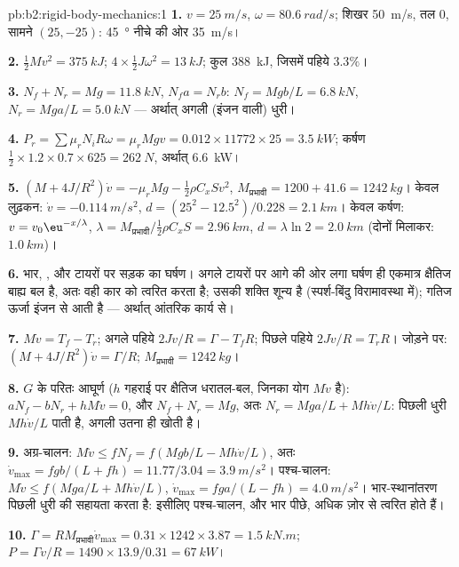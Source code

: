 \begin{solution}{pb:b2:rigid-body-mechanics:1}
\textbf{1.} $v = \qty{25}{m/s}$, $\omega = \qty{80.6}{rad/s}$; शिखर \qty{50}{m/s},
तल $0$, सामने $(25, -25)$: \qty{45}{\degree} नीचे की ओर \qty{35}{m/s}।

\textbf{2.} $\tfrac12Mv^2 = \qty{375}{kJ}$;
$4 \times \tfrac12J\omega^2 = \qty{13}{kJ}$;
कुल \qty{388}{kJ}, जिसमें पहिये $3.3\%$।

\textbf{3.} $N_f + N_r = Mg = \qty{11.8}{kN}$, $N_fa = N_rb$:
$N_f = Mgb/L =
\qty{6.8}{kN}$, $N_r = Mga/L = \qty{5.0}{kN}$ --- अर्थात्
अगली (इंजन वाली) धुरी।

\textbf{4.}
$P_r = \sum\mu_rN_iR\omega = \mu_rMgv = 0.012 \times 11772 \times 25 =
\qty{3.5}{kW}$;
कर्षण $\tfrac12 \times 1.2 \times 0.7 \times 625 = \qty{262}{N}$, अर्थात्
\qty{6.6}{kW}।

\textbf{5.} $(M + 4J/R^2)\dot v = -\mu_rMg - \tfrac12\rho C_xSv^2$,
$M_{\text{प्रभावी}} =
1200 + 41.6 = \qty{1242}{kg}$। केवल लुढ़कन:
$\dot v = \qty{-0.114}{m/s^2}$,
$d = (25^2 - 12.5^2)/0.228 = \qty{2.1}{km}$। केवल कर्षण: $v = v_0\eu^{-x/\lambda}$,
$\lambda = M_{\text{प्रभावी}}/\tfrac12\rho C_xS = \qty{2.96}{km}$,
$d = \lambda\ln2 =
\qty{2.0}{km}$ (दोनों मिलाकर: $\qty{1.0}{km}$)।

\textbf{6.} भार, , और टायरों पर सड़क का घर्षण।
अगले टायरों पर आगे की ओर लगा घर्षण ही एकमात्र क्षैतिज बाह्य
बल है, अतः वही कार को त्वरित करता है; उसकी शक्ति शून्य है (स्पर्श-बिंदु
विरामावस्था में); गतिज ऊर्जा इंजन से आती है --- अर्थात् आंतरिक कार्य से।

\textbf{7.} $M\dot v = T_f - T_r$; अगले पहिये $2J\dot v/R = \Gamma - T_fR$;
पिछले पहिये $2J\dot v/R = T_rR$। जोड़ने पर: $(M + 4J/R^2)\dot v = \Gamma/R$;
$M_{\text{प्रभावी}} = \qty{1242}{kg}$।

\textbf{8.} $G$ के परितः आघूर्ण ($h$ गहराई पर क्षैतिज धरातल-बल, जिनका
योग $M\dot v$ है): $aN_f - bN_r + hM\dot v = 0$, और $N_f + N_r = Mg$, अतः
$N_r = Mga/L + Mh\dot v/L$: पिछली धुरी $Mh\dot v/L$ पाती है, अगली उतना ही खोती है।

\textbf{9.} अग्र-चालन: $M\dot v \le fN_f = f(Mgb/L - Mh\dot v/L)$, अतः
$\dot v_{\max} = fgb/(L + fh) = 11.77/3.04 = \qty{3.9}{m/s^2}$। पश्च-चालन:
$M\dot v \le f(Mga/L + Mh\dot v/L)$,
$\dot v_{\max} = fga/(L - fh) = \qty{4.0}{m/s^2}$।
भार-स्थानांतरण पिछली धुरी की सहायता करता है: इसीलिए पश्च-चालन, और भार पीछे,
अधिक ज़ोर से त्वरित होते हैं।

\textbf{10.}
$\Gamma = RM_{\text{प्रभावी}}\dot v_{\max} = 0.31 \times 1242 \times 3.87 =
\qty{1.5}{kN.m}$;
$P = \Gamma v/R = 1490 \times 13.9/0.31 = \qty{67}{kW}$।


\end{solution}
